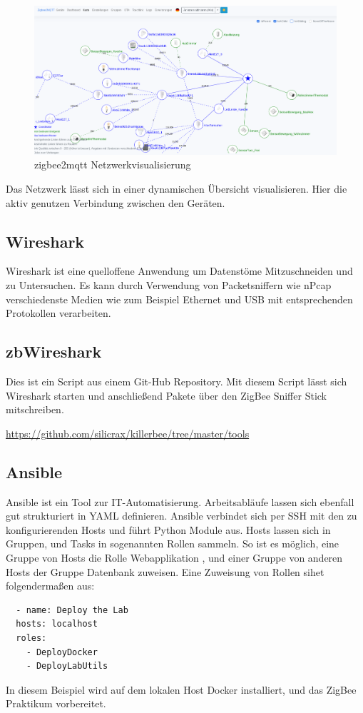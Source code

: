 \begin{figure}[H]
  \centering
  \includegraphics[width=1\textwidth]{media/z2m-map.png}
  \caption{zigbee2mqtt Netzwerkvisualisierung}
\end{figure}

Das Netzwerk lässt sich in einer dynamischen Übersicht visualisieren. Hier die aktiv genutzen Verbindung zwischen den Geräten. 

\subsection{Wireshark}

Wireshark ist eine quelloffene Anwendung um Datenstöme Mitzuschneiden und zu Untersuchen. Es kann durch Verwendung
von Packetsniffern wie nPcap verschiedenste Medien wie zum Beispiel Ethernet und USB mit entsprechenden Protokollen
verarbeiten.


\subsection{zbWireshark}

Dies ist ein Script aus einem Git-Hub Repository. Mit diesem Script lässt sich Wireshark starten und anschließend Pakete über den 
ZigBee Sniffer Stick mitschreiben.

\url{https://github.com/silicrax/killerbee/tree/master/tools}

\subsection{Ansible}

Ansible ist ein Tool zur IT-Automatisierung. Arbeitsabläufe lassen sich ebenfall gut strukturiert in YAML definieren. Ansible verbindet sich per SSH 
mit den zu konfigurierenden Hosts und führt Python Module aus. Hosts lassen sich in Gruppen, und Tasks in sogenannten Rollen sammeln. So ist es möglich,
eine Gruppe von Hosts die Rolle \grqq Webapplikation \grqq{}, und einer Gruppe von anderen Hosts der Gruppe \grqq Datenbank \grqq{} zuweisen. 
Eine Zuweisung von Rollen sihet folgendermaßen aus:
\begin{lstlisting}
  - name: Deploy the Lab
  hosts: localhost
  roles:
    - DeployDocker
    - DeployLabUtils
\end{lstlisting}

In diesem Beispiel wird auf dem lokalen Host Docker installiert, und das ZigBee Praktikum vorbereitet.

\subsection{}
